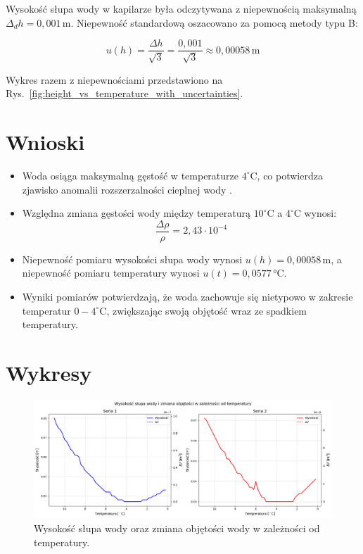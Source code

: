 \documentclass[a4paper,12pt]{article}
\begin{document}
Wysokość słupa wody w kapilarze była odczytywana z niepewnością maksymalną $\Delta_d h = 0{,}001\,\text{m}$. Niepewność standardową oszacowano za pomocą metody typu B:

\begin{equation}
    u(h) = \frac{\Delta h}{\sqrt{3}} = \frac{0{,}001}{\sqrt{3}} \approx 0{,}00058\,\text{m}
\end{equation}

Wykres razem z niepewnościami przedstawiono na Rys.~\ref{fig:height_vs_temperature_with_uncertainties}.

\section{Wnioski}

\begin{itemize}
    \item Woda osiąga maksymalną gęstość w temperaturze $4^\circ$C, co potwierdza zjawisko anomalii rozszerzalności cieplnej wody \cite{fizyka_dla_szkół_wyższych_tom_2}.

    \item Względna zmiana gęstości wody między temperaturą $10^\circ$C a $4^\circ$C wynosi:
          \[
              \frac{\Delta \rho}{\rho} = 2{,}43 \cdot 10^{-4}
          \]

    \item Niepewność pomiaru wysokości słupa wody wynosi $u(h) = 0{,}00058\,\text{m}$, a niepewność pomiaru temperatury wynosi $u(t) = 0{,}0577\,\text{°C}$.

    \item Wyniki pomiarów potwierdzają, że woda zachowuje się nietypowo w zakresie temperatur $0-4^\circ$C, zwiększając swoją objętość wraz ze spadkiem temperatury.
\end{itemize}

\newpage
\section{Wykresy}

\begin{figure}[H]
    \centering
    \includegraphics[width=0.9\textheight,angle=90]{height_vs_temperature.png}
    \caption{Wysokość słupa wody oraz zmiana objętości wody w zależności od temperatury.}
    \label{fig:height_vs_temperature}
\end{figure}
\end{document}
